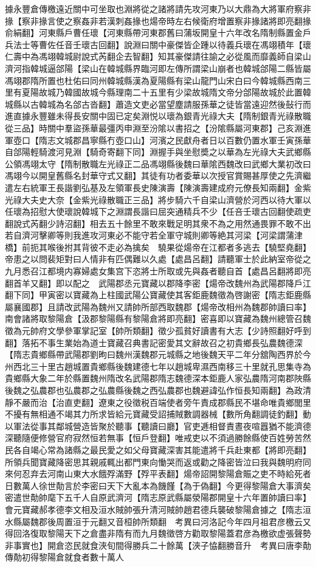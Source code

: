 據永豐倉傳檄遠近關中可坐取也淵將從之諸將請先攻河東乃以大鼎為大將軍府察非掾【察非掾言使之察姦非若漢刺姦掾也煬帝時左右候衛府增置察非掾諸將即亮翻掾俞絹翻】河東縣戶曹任瓌【河東縣帶河東郡舊曰蒲坂開皇十六年改名隋制縣置金戶兵法士等曹佐任音壬瓌古回翻】說淵曰關中豪傑皆企踵以待義兵瓌在馮翊積年【瓌仁壽中為馮翊韓城尉說式芮翻企去智翻】知其豪傑請往諭之必從風而靡義師自梁山濟河指韓城逼郃陽【梁山在韓城縣界臨河即左傳所謂梁山崩者也韓城郃陽二縣皆屬馮翊郡隋所置也杜佑曰同州韓城縣漢為夏陽縣有梁山龍門山宋白曰今韓城縣西南三里有夏陽故城乃韓國故城今縣理南二十五里有少梁故城隋文帝分郃陽故城於此置韓城縣以古韓城為名郃古沓翻】蕭造文吏必當望塵請服孫華之徒皆當遠迎然後鼔行而進直據永豐雖未得長安關中固已定矣淵悦以瓌為銀青光祿大夫【隋制銀青光祿散職從三品】時關中羣盜孫華最彊丙申淵至汾隂以書招之【汾隂縣屬河東郡】己亥淵進軍壺口【隋志文城郡昌寧縣冇壺口山】河濱之民獻舟者日以百數仍置水軍壬寅孫華自郃陽輕騎渡河見淵【騎奇寄翻下同】淵握手與坐慰奬之以華為左光祿大夫武鄉縣公領馮翊太守【隋制散職左光祿正二品馮翊縣後魏曰華隂西魏改曰武鄉大業初改曰馮翊今以開皇舊縣名封華守式又翻】其徒有功者委華以次授官賞賜甚厚使之先濟繼遣左右統軍王長諧劉弘基及左領軍長史陳演壽【陳演壽建成府元僚長知兩翻】金紫光祿大夫史大奈【金紫光祿散職正三品】將步騎六千自梁山濟營於河西以待大軍以任瓌為招慰大使瓌說韓城下之淵謂長諧曰屈突通精兵不少【任咅壬瓌古回翻使疏吏翻說式芮翻少詩沼翻】相去五十餘里不敢來戰足明其衆不為之用然通畏罪不敢不出若自濟河擊卿等則我進攻河東必不能守若全軍守城則卿等絶其河梁【河梁謂蒲津橋】前扼其喉後拊其背彼不走必為擒矣　驍果從煬帝在江都者多逃去【驍堅堯翻】帝患之以問裴矩對曰人情非有匹偶難以久處【處昌呂翻】請聽軍士於此納室帝從之九月悉召江都境内寡婦處女集宫下恣將士所取或先與姦者聽自首【處昌呂翻將即亮翻首羊又翻】即以配之　武陽郡丞元寶藏以郡降李密【煬帝改魏州為武陽郡降戶江翻下同】甲寅密以寶藏為上柱國武陽公寶藏使其客鉅鹿魏徵為啓謝密【隋志鉅鹿縣屬襄國郡】且請改武陽為魏州又請帥所部西取魏郡【煬帝改相州為魏郡帥讀曰率】南會諸將取黎陽倉【汲郡黎陽縣有黎陽倉將即亮翻】密喜即以寶藏為魏州總管召魏徵為元帥府文學參軍掌記室【帥所類翻】徵少孤貧好讀書有大志【少詩照翻好呼到翻】落拓不事生業始為道士寶藏召典書記密愛其文辭故召之初貴鄉長弘農魏德深【隋志貴鄉縣帶武陽郡劉昫曰魏州漢魏郡元城縣之地後魏天平二年分舘陶西界於今州西北三十里古趙城置貴鄉縣後魏建德七年以趙城卑濕西南移三十里就孔思集寺為貴鄉縣大象二年於縣置魏州隋改名武陽郡隋志魏德深本鉅鹿人家弘農隋河南郡陜縣後魏之弘農郡也弘農郡之弘農縣後魏之西弘農郡也魏避諱弘作恒長知兩翻】為政清靜不嚴而治【治直吏翻】遼東之役徵税百端使者旁午責成郡縣民不堪命唯貴鄉閭里不擾有無相通不竭其力所求皆給元寶藏受詔捕賊數調器械【數所角翻調徒釣翻】動以軍法從事其鄰城營造皆聚於聽事【聽讀曰廳】官吏逓相督責晝夜喧囂猶不能濟德深聽隨便修營官府寂然恒若無事【恒戶登翻】唯戒吏以不須過勝餘縣使百姓勞苦然民各自竭心常為諸縣之最民愛之如父母寶藏深害其能遣將千兵赴東都【將即亮翻】所領兵聞寶藏降密思其親戚輒出都門東向慟哭而返或勸之降密皆泣曰我與魏明府同來何忍弃去河南山東大水餓殍滿野【殍平表翻】煬帝詔開黎陽倉賑之吏不時給死者日數萬人徐世勣言於李密曰天下大亂本為饑饉【為于偽翻】今更得黎陽倉大事濟矣密遣世勣帥麾下五千人自原武濟河【隋志原武縣屬滎陽郡開皇十六年置帥讀曰率】會元寶藏郝孝德李文相及洹水賊帥張升清河賊帥趙君德兵襲破黎陽倉據之【隋志洹水縣屬魏郡後周置洹于元翻又音桓帥所類翻　考異曰河洛記今年四月祖君彦檄云又得回洛復取黎陽天下之倉盡非隋有而九月魏徵啓方勸取黎陽蓋君彦為檄欲虚張聲勢非事實也】開倉恣民就食浹旬間得勝兵二十餘萬【浹子恊翻勝音升　考異曰唐李勣傳勣初得黎陽倉就食者數十萬人